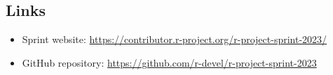 \hypertarget{links}{%
\subsection{Links}\label{links}}

\begin{itemize}
\tightlist
\item
  Sprint website: \url{https://contributor.r-project.org/r-project-sprint-2023/}
\item
  GitHub repository: \url{https://github.com/r-devel/r-project-sprint-2023}
\end{itemize}


\address{%
Heather Turner\\
University of Warwick\\%
Coventry, United Kingdom\\
%
\url{https://warwick.ac.uk/heatherturner}\\%
\textit{ORCiD: \href{https://orcid.org/0000-0002-1256-3375}{0000-0002-1256-3375}}\\%
\href{mailto:h.turner.1@warwick.ac.uk}{\nolinkurl{h.turner.1@warwick.ac.uk}}%
}
